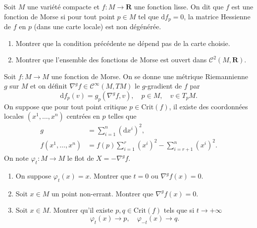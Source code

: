 \documentclass[a4paper,10pt,openany]{article}
\theoremstyle{plain}
\theoremstyle{definition}
\newcommand{\dd}{\mathrm{d}}
\newcommand{\R}{\mathbf{R}}
\begin{document}
\vspace{0.6cm}

 \vspace{1.5mm} 

\noindent Soit $M$ une vari\'et\'e compacte et $f : M \to \R$ une fonction lisse. On dit que $f$ est une fonction de Morse si pour tout point $p \in M$ tel que $\dd f_p = 0$, la matrice Hessienne de $f$ en $p$ (dans une carte locale) est non d\'eg\'en\'er\'ee.
\begin{enumerate}
\item Montrer que la condition pr\'ec\'edente ne d\'epend pas de la carte choisie.
\item Montrer que l'ensemble des fonctions de Morse est ouvert dans $\mathcal{C}^2(M, \R).$
\end{enumerate}
Soit $f : M \to M$ une fonction de Morse. On se donne une m\'etrique Riemannienne $g$ sur $M$ et on d\'efinit $\nabla^g f \in \mathcal{C}^\infty(M,TM)$ le $g$-gradient de $f$ par
$$
\dd f_p(v) = g_p(\nabla^g f, v), \quad p \in M, \quad v \in T_pM.
$$
On suppose que pour tout point critique $p \in \mathrm{Crit}(f)$, il existe des coordonn\'ees locales $(x^1, \dots, x^n)$ centr\'ees en $p$ telles que
$$
\begin{aligned}
g &= \sum_{i=1}^n (\dd x^i)^2, \\
f(x^1, \dots, x^n) &= f(p) \sum_{i=1}^r (x^i)^2 - \sum_{i=r+1}^n (x^i)^2.
\end{aligned}
$$
On note $\varphi_t : M \to M$ le flot de $X = -\nabla^gf$.
\begin{enumerate}[resume]
\item On suppose $\varphi_t(x) = x$. Montrer que $t = 0$ ou $\nabla^gf (x) = 0$.
\item Soit $x \in M$ un point non-errant. Montrer que $\nabla^g f(x) = 0$.
\item Soit $x \in M$. Montrer qu'il existe $p,q \in \mathrm{Crit}(f)$ tels que si $t \to +\infty$
$$
\varphi_t(x) \to p, \quad \varphi_{-t}(x) \to q.
$$
\end{enumerate}
\end{document}
